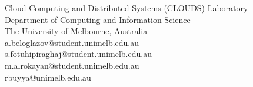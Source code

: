 Cloud Computing and Distributed Systems (CLOUDS) Laboratory\\
Department of Computing and Information Science\\
The University of Melbourne, Australia\\
a.beloglazov@student.unimelb.edu.au\\
s.fotuhipiraghaj@student.unimelb.edu.au\\
m.alrokayan@student.unimelb.edu.au\\
rbuyya@unimelb.edu.au
